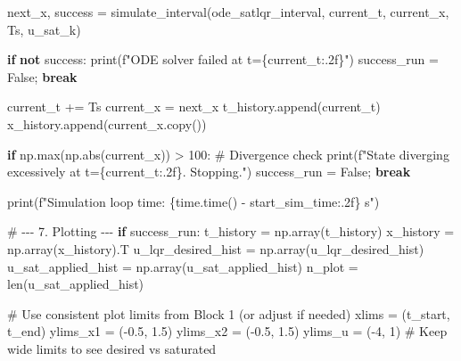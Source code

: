 \documentclass[
  letterpaper,
  DIV=11,
  numbers=noendperiod,
  oneside]{scrartcl}
\newenvironment{Shaded}{\begin{snugshade}}{\end{snugshade}}
\newcommand{\BuiltInTok}[1]{\textcolor[rgb]{0.00,0.23,0.31}{#1}}
\newcommand{\CommentTok}[1]{\textcolor[rgb]{0.37,0.37,0.37}{#1}}
\newcommand{\ControlFlowTok}[1]{\textcolor[rgb]{0.00,0.23,0.31}{\textbf{#1}}}
\newcommand{\DecValTok}[1]{\textcolor[rgb]{0.68,0.00,0.00}{#1}}
\newcommand{\FloatTok}[1]{\textcolor[rgb]{0.68,0.00,0.00}{#1}}
\newcommand{\KeywordTok}[1]{\textcolor[rgb]{0.00,0.23,0.31}{\textbf{#1}}}
\newcommand{\NormalTok}[1]{\textcolor[rgb]{0.00,0.23,0.31}{#1}}
\newcommand{\OperatorTok}[1]{\textcolor[rgb]{0.37,0.37,0.37}{#1}}
\newcommand{\SpecialCharTok}[1]{\textcolor[rgb]{0.37,0.37,0.37}{#1}}
\newcommand{\SpecialStringTok}[1]{\textcolor[rgb]{0.13,0.47,0.30}{#1}}
\newcommand{\VariableTok}[1]{\textcolor[rgb]{0.07,0.07,0.07}{#1}}
\begin{document}
\begin{Shaded}
\begin{Highlighting}[numbers=left,,]
\NormalTok{    next\_x, success }\OperatorTok{=}\NormalTok{ simulate\_interval(ode\_satlqr\_interval, current\_t, current\_x, Ts, u\_sat\_k)}

    \ControlFlowTok{if} \KeywordTok{not}\NormalTok{ success:}
        \BuiltInTok{print}\NormalTok{(}\SpecialStringTok{f"ODE solver failed at t=}\SpecialCharTok{\{}\NormalTok{current\_t}\SpecialCharTok{:.2f\}}\SpecialStringTok{"}\NormalTok{)}
\NormalTok{        success\_run }\OperatorTok{=} \VariableTok{False}\OperatorTok{;} \ControlFlowTok{break}

\NormalTok{    current\_t }\OperatorTok{+=}\NormalTok{ Ts}
\NormalTok{    current\_x }\OperatorTok{=}\NormalTok{ next\_x}
\NormalTok{    t\_history.append(current\_t)}
\NormalTok{    x\_history.append(current\_x.copy())}

    \ControlFlowTok{if}\NormalTok{ np.}\BuiltInTok{max}\NormalTok{(np.}\BuiltInTok{abs}\NormalTok{(current\_x)) }\OperatorTok{\textgreater{}} \DecValTok{100}\NormalTok{: }\CommentTok{\# Divergence check}
        \BuiltInTok{print}\NormalTok{(}\SpecialStringTok{f"State diverging excessively at t=}\SpecialCharTok{\{}\NormalTok{current\_t}\SpecialCharTok{:.2f\}}\SpecialStringTok{. Stopping."}\NormalTok{)}
\NormalTok{        success\_run }\OperatorTok{=} \VariableTok{False}\OperatorTok{;} \ControlFlowTok{break}

\BuiltInTok{print}\NormalTok{(}\SpecialStringTok{f"Simulation loop time: }\SpecialCharTok{\{}\NormalTok{time}\SpecialCharTok{.}\NormalTok{time() }\OperatorTok{{-}}\NormalTok{ start\_sim\_time}\SpecialCharTok{:.2f\}}\SpecialStringTok{ s"}\NormalTok{)}

\CommentTok{\# {-}{-}{-} 7. Plotting {-}{-}{-}}
\ControlFlowTok{if}\NormalTok{ success\_run:}
\NormalTok{    t\_history }\OperatorTok{=}\NormalTok{ np.array(t\_history)}
\NormalTok{    x\_history }\OperatorTok{=}\NormalTok{ np.array(x\_history).T}
\NormalTok{    u\_lqr\_desired\_hist }\OperatorTok{=}\NormalTok{ np.array(u\_lqr\_desired\_hist)}
\NormalTok{    u\_sat\_applied\_hist }\OperatorTok{=}\NormalTok{ np.array(u\_sat\_applied\_hist)}
\NormalTok{    n\_plot }\OperatorTok{=} \BuiltInTok{len}\NormalTok{(u\_sat\_applied\_hist)}

    \CommentTok{\# Use consistent plot limits from Block 1 (or adjust if needed)}
\NormalTok{    xlims }\OperatorTok{=}\NormalTok{ (t\_start, t\_end)}
\NormalTok{    ylims\_x1 }\OperatorTok{=}\NormalTok{ (}\OperatorTok{{-}}\FloatTok{0.5}\NormalTok{, }\FloatTok{1.5}\NormalTok{)}
\NormalTok{    ylims\_x2 }\OperatorTok{=}\NormalTok{ (}\OperatorTok{{-}}\FloatTok{0.5}\NormalTok{, }\FloatTok{1.5}\NormalTok{)}
\NormalTok{    ylims\_u }\OperatorTok{=}\NormalTok{ (}\OperatorTok{{-}}\DecValTok{4}\NormalTok{, }\DecValTok{1}\NormalTok{) }\CommentTok{\# Keep wide limits to see desired vs saturated}


\end{Highlighting}
\end{Shaded}
\end{document}
